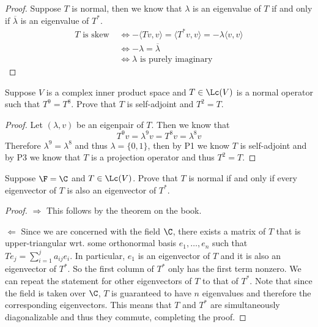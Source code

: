 \documentclass{extarticle}
\begin{document}
\begin{proof}
Suppose \(T\) is normal, then we know that \(\lambda\) is an eigenvalue of \(T\) if and only if
\(\overline{\lambda}\) is an eigenvalue of \(T^*\).
\begin{align*}
    T \text{ is skew }
    &\Longleftrightarrow -\langle Tv,v \rangle = \langle T^*v,v \rangle = - \lambda \langle v,v \rangle \\
    &\Longleftrightarrow -\lambda = \overline{\lambda} \\
    &\Longleftrightarrow \lambda \text{ is purely imaginary}
\end{align*}
\end{proof}

\begin{problem}{6}
    Suppose \(V\) is a complex inner product space and \(T \in \Lc(V)\) is a normal operator such
    that \(T^9 = T^8\). Prove that \(T\) is self-adjoint and \(T^2 = T\).
\end{problem}

\begin{proof}
Let \((\lambda, v)\) be an eigenpair of \(T\). Then we know that
\[T^9v = \lambda^9 v = T^8v = \lambda^8 v\]
Therefore \(\lambda^9 = \lambda^8\) and thus \(\lambda = \{0, 1\}\), then by P1 we know \(T\)
is self-adjoint and by P3 we know that \(T\) is a projection operator and thus \(T^2 = T\).
\end{proof}

\begin{problem}{8}
    Suppose \(\F = \C\) and \(T \in \Lc(V)\). Prove that \(T\) is normal if and only if
    every eigenvector of \(T\) is also an eigenvector of \(T^*\).
\end{problem}

\begin{proof}
\(\Rightarrow\) This follows by the theorem on the book.

\(\Leftarrow\) Since we are concerned with the field \(\C\), there exists a matrix of \(T\) that
is upper-triangular wrt. some orthonormal basis \(e_1, \ldots, e_n\) such that
\(T e_j = \sum_{i=1}^{j} a_{ij} e_i\). In particular, \(e_1\) is an eigenvector of \(T\) and it is
also an eigenvector of \(T^*\). So the first column of \(T^*\) only has the first term nonzero. We can
repeat the statement for other eigenvectors of \(T\) to that of \(T^*\). Note that since the field
is taken over \(\C\), \(T\) is guaranteed to have \(n\) eigenvalues and therefore the corresponding
eigenvectors. This means that \(T\) and \(T^*\) are simultaneously diagonalizable and thus they
commute, completing the proof.
\end{proof}
\end{document}
